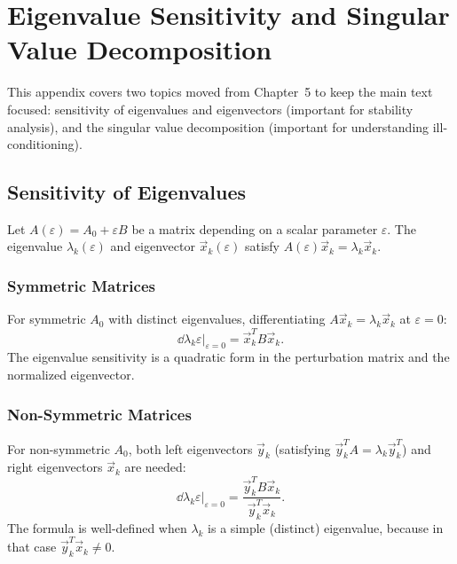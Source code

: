 
\chapter{Eigenvalue Sensitivity and Singular Value Decomposition}
\label{app:eigenvalue}

This appendix covers two topics moved from Chapter~5 to keep the
main text focused: sensitivity of eigenvalues and eigenvectors
(important for stability analysis), and the singular value
decomposition (important for understanding ill-conditioning).

\section{Sensitivity of Eigenvalues}
\label{appsec:eigensens}

Let $A(\varepsilon) = A_0 + \varepsilon B$ be a matrix depending
on a scalar parameter $\varepsilon$. The eigenvalue $\lambda_k(\varepsilon)$
and eigenvector $\vec{x}_k(\varepsilon)$ satisfy
$A(\varepsilon)\vec{x}_k = \lambda_k\vec{x}_k$.

\subsection{Symmetric Matrices}

For symmetric $A_0$ with distinct eigenvalues, differentiating
$A\vec{x}_k = \lambda_k\vec{x}_k$ at $\varepsilon = 0$:
\begin{equation}
  \dd{\lambda_k}{\varepsilon}\bigg|_{\varepsilon=0}
  = \vec{x}_k^T B\vec{x}_k.
  \label{eq:eigsens_sym}
\end{equation}
The eigenvalue sensitivity is a quadratic form in the perturbation
matrix and the normalized eigenvector.

\subsection{Non-Symmetric Matrices}

For non-symmetric $A_0$, both left eigenvectors $\vec{y}_k$
(satisfying $\vec{y}_k^T A = \lambda_k\vec{y}_k^T$) and right
eigenvectors $\vec{x}_k$ are needed:
\begin{equation}
  \dd{\lambda_k}{\varepsilon}\bigg|_{\varepsilon=0}
  = \frac{\vec{y}_k^T B \vec{x}_k}{\vec{y}_k^T \vec{x}_k}.
  \label{eq:eigsens_nonsym}
\end{equation}
The formula is well-defined when $\lambda_k$ is a simple (distinct)
eigenvalue, because in that case $\vec{y}_k^T\vec{x}_k \neq 0$.

